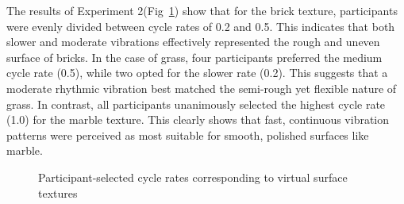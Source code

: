 \documentclass[a4paper,twocolumn]{article}
\begin{document}
The results of Experiment 2(Fig~\ref{fig:ex2_results}) show that for the brick texture, participants were evenly divided between cycle rates of 0.2 and 0.5. This indicates that both slower and moderate vibrations effectively represented the rough and uneven surface of bricks.
In the case of grass, four participants preferred the medium cycle rate (0.5), while two opted for the slower rate (0.2). This suggests that a moderate rhythmic vibration best matched the semi-rough yet flexible nature of grass.
In contrast, all participants unanimously selected the highest cycle rate (1.0) for the marble texture. This clearly shows that fast, continuous vibration patterns were perceived as most suitable for smooth, polished surfaces like marble.


\begin{figure}[H]\centering
	
	\caption{Participant-selected cycle rates corresponding to virtual surface textures}\label{fig:ex2_results}
\end{figure}
\end{document}
